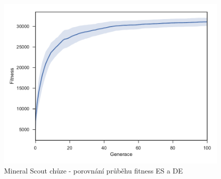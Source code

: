 \begin{figure}[t]\centering
	\includegraphics[width=\columnwidth]{../img/MineralMap/MineralScoutWalk}
	\caption{Mineral Scout chůze - porovnání průběhu fitness ES a DE}
	\label{obr04:MineralScoutWalk}
\end{figure}
\clearpage


